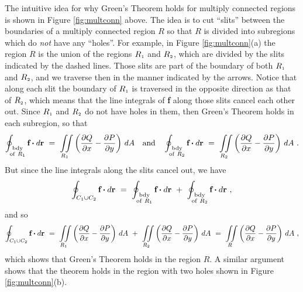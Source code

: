 The intuitive idea for why Green's Theorem holds for multiply connected regions is shown in Figure \ref{fig:multconn}
above. The idea is to cut ``slits'' between the boundaries of a multiply connected region $R$ so that $R$ is divided
into subregions which do \emph{not} have any ``holes''. For example, in Figure \ref{fig:multconn}(a) the region $R$
is the union of the regions $R_{\scriptscriptstyle 1}$ and $R_{\scriptscriptstyle 2}$, which are divided by the slits indicated by the dashed
lines. Those slits are part of the boundary of both $R_{\scriptscriptstyle 1}$ and $R_{\scriptscriptstyle 2}$, and we traverse then in the manner
indicated by the arrows. Notice that along each slit
the boundary of $R_{\scriptscriptstyle 1}$ is traversed in the opposite direction as that of $R_{\scriptscriptstyle 2}$, which means that the
line integrals of \textbf{f} along those slits cancel each other out.
Since $R_{\scriptscriptstyle 1}$ and $R_{\scriptscriptstyle 2}$ do not have holes in them, then Green's Theorem holds in each subregion, so that
\begin{displaymath}
 \oint_{\substack{\text{bdy}\\\text{of}~R_{\scriptscriptstyle 1}}} \textbf{f} \bm{\cdot} d\textbf{r} ~=~ \iint\limits_{R_{\scriptscriptstyle 1}}
  \left( \frac{\partial Q}{\partial x} - \frac{\partial P}{\partial y} \right)\,dA \quad\text{and}\quad
 \oint_{\substack{\text{bdy}\\\text{of}~R_{\scriptscriptstyle 2}}} \textbf{f} \bm{\cdot} d\textbf{r} ~=~ \iint\limits_{R_{\scriptscriptstyle 2}}
  \left( \frac{\partial Q}{\partial x} - \frac{\partial P}{\partial y} \right)\,dA ~.
\end{displaymath}
But since the line integrals along the slits cancel out, we have
\begin{displaymath}
 \oint_{C_{\scriptscriptstyle 1} \cup C_{\scriptscriptstyle 2}} \textbf{f} \bm{\cdot} d\textbf{r} ~=~
 \oint_{\substack{\text{bdy}\\\text{of}~R_{\scriptscriptstyle 1}}} \textbf{f} \bm{\cdot} d\textbf{r} ~+~
 \oint_{\substack{\text{bdy}\\\text{of}~R_{\scriptscriptstyle 2}}} \textbf{f} \bm{\cdot} d\textbf{r} ~,
\end{displaymath}
and so
\begin{displaymath}
 \oint_{C_{\scriptscriptstyle 1} \cup C_{\scriptscriptstyle 2}} \textbf{f} \bm{\cdot} d\textbf{r} ~=~ \iint\limits_{R_{\scriptscriptstyle 1}}
  \left( \frac{\partial Q}{\partial x} - \frac{\partial P}{\partial y} \right)\,dA ~+~ \iint\limits_{R_{\scriptscriptstyle 2}}
  \left( \frac{\partial Q}{\partial x} - \frac{\partial P}{\partial y} \right)\,dA ~=~ \iint\limits_{R}
  \left( \frac{\partial Q}{\partial x} - \frac{\partial P}{\partial y} \right)\,dA ~,
\end{displaymath}
which shows that Green's Theorem holds in the region $R$. A similar argument shows that the theorem holds in the
region with two holes shown in Figure \ref{fig:multconn}(b).

